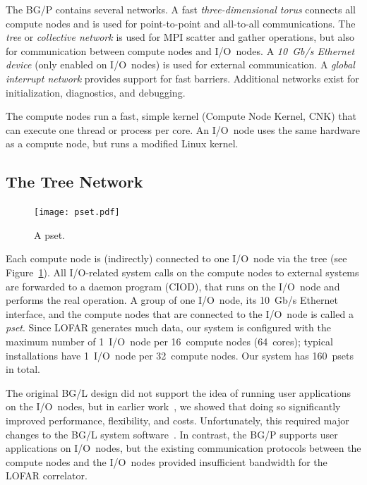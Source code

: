 \documentclass[conference]{worldcomp}
\begin{document}
The BG/P contains several networks.
A fast \emph{three-dimensional torus\/} connects all compute nodes and is used
for point-to-point and all-to-all communications.
The \emph{tree\/} or \emph{collective network\/} is used for MPI scatter and
gather operations, but also for communication between compute nodes and
I/O~nodes.
A \emph{10~Gb/s Ethernet device\/} (only enabled on I/O~nodes) is used for
external communication.
A \emph{global interrupt network\/} provides support for fast barriers.
Additional networks exist for initialization, diagnostics, and debugging.

The compute nodes run a fast, simple kernel (Compute Node Kernel, CNK) that
can execute one thread or process per core.
An I/O~node uses the same hardware as a compute node, but runs a modified
Linux kernel.


\subsection{The Tree Network}

\begin{figure}[h]
\texttt{[image: pset.pdf]}
\caption{A pset.}
\label{fig:pset}
\end{figure}

Each compute node is (indirectly) connected to one I/O~node via the tree
(see Figure~\ref{fig:pset}).
All I/O-related system calls on the compute nodes to external systems are
forwarded to a daemon program (CIOD), that runs on the
I/O~node and performs the real operation.
A group of one I/O~node, its 10~Gb/s Ethernet interface, and the compute
nodes that are connected to the I/O~node is called a \emph{pset}.
Since LOFAR generates much data, our system is configured with
the maximum number of 1~I/O~node per 16~compute nodes (64~cores); typical
installations have 1~I/O~node per 32~compute nodes.
Our system has 160~psets in total.

The original BG/L design did not support the idea of running user applications
on the I/O~nodes, but in earlier work~\cite{Iskra:08}, we showed that doing so 
significantly improved performance, flexibility, and costs.
Unfortunately, this required major changes to the BG/L system
software~\cite{Iskra:08,Boonstoppel:08}.
In contrast, the BG/P supports user applications on I/O~nodes, but
the existing communication protocols between the compute nodes and the
I/O~nodes provided insufficient bandwidth for the LOFAR correlator.
\end{document}
